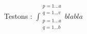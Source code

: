 \documentclass{article}
\begin{document}
Testons : $ \displaystyle \int_{\substack{p=1\dots a \\ q=1\dots b}}^{\substack{p=1\dots a \\ q=1\dots v}}{blabla} $
\end{document}

